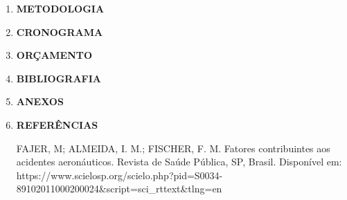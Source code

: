 \documentclass[14pt, a4paper]{article}
\begin{document}
\begin{enumerate}
		
		\item \textbf{METODOLOGIA}\newline
		\item \textbf{CRONOGRAMA}\newline
		\item \textbf{ORÇAMENTO}\newline
		\item \textbf{BIBLIOGRAFIA}\newline
		\item \textbf{ANEXOS}\newline
		\item \textbf{REFERÊNCIAS}\newline
		
		FAJER, M; ALMEIDA, I. M.; FISCHER, F. M. Fatores contribuintes aos acidentes aeronáuticos. Revista de Saúde Pública, SP, Brasil. Disponível em: https://www.scielosp.org/scielo.php?pid=S0034-89102011000200024&script=sci_rttext&tlng=en
	\end{enumerate}
	
	
	
	
\end{document}
